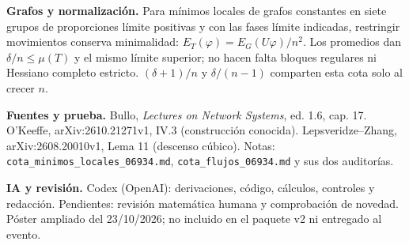 \documentclass[12pt]{article}
\begin{document}
\vspace{2mm}
{\fontsize{19}{24}\selectfont
\textbf{Grafos y normalización.} Para mínimos locales de grafos constantes en siete grupos de proporciones límite positivas y con las fases límite indicadas, restringir movimientos conserva minimalidad: $E_T(\varphi)=E_G(U\varphi)/n^2$. Los promedios dan $\delta/n\leq\mu(T)$ y el mismo límite superior; no hacen falta bloques regulares ni Hessiano completo estricto. $(\delta+1)/n$ y $\delta/(n-1)$ comparten esta cota solo al crecer $n$.
\par
\textbf{Fuentes y prueba.} Bullo, \textit{Lectures on Network Systems}, ed. 1.6, cap. 17. O'Keeffe, arXiv:2610.21271v1, IV.3 (construcción conocida). Lepsveridze--Zhang, arXiv:2608.20010v1, Lema 11 (descenso cúbico). Notas: \texttt{cota\_minimos\_locales\_06934.md}, \texttt{cota\_flujos\_06934.md} y sus dos auditorías.
\par
\textbf{IA y revisión.} Codex (OpenAI): derivaciones, código, cálculos, controles y redacción. Pendientes: revisión matemática humana y comprobación de novedad. Póster ampliado del 23/10/2026; no incluido en el paquete v2 ni entregado al evento.
}
\end{document}
